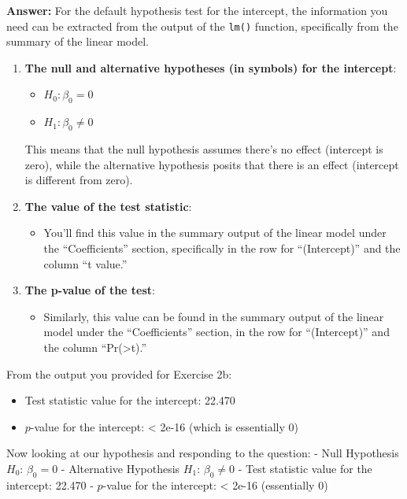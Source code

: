 \documentclass[
]{article}
\providecommand{\tightlist}{%
  \setlength{\itemsep}{0pt}\setlength{\parskip}{0pt}}
\begin{document}
\textbf{Answer:} For the default hypothesis test for the intercept, the
information you need can be extracted from the output of the
\texttt{lm()} function, specifically from the summary of the linear
model.

\begin{enumerate}
\def\labelenumi{\arabic{enumi}.}
\item
  \textbf{The null and alternative hypotheses (in symbols) for the
  intercept}:

  \begin{itemize}
  \tightlist
  \item
    \(H_0: \beta_0 = 0\)
  \item
    \(H_1: \beta_0 \neq 0\)
  \end{itemize}

  This means that the null hypothesis assumes there's no effect
  (intercept is zero), while the alternative hypothesis posits that
  there is an effect (intercept is different from zero).
\item
  \textbf{The value of the test statistic}:

  \begin{itemize}
  \tightlist
  \item
    You'll find this value in the summary output of the linear model
    under the ``Coefficients'' section, specifically in the row for
    ``(Intercept)'' and the column ``t value.''
  \end{itemize}
\item
  \textbf{The p-value of the test}:

  \begin{itemize}
  \tightlist
  \item
    Similarly, this value can be found in the summary output of the
    linear model under the ``Coefficients'' section, in the row for
    ``(Intercept)'' and the column
    ``Pr(\textgreater\textbar t\textbar).''
  \end{itemize}
\end{enumerate}

From the output you provided for Exercise 2b:

\begin{itemize}
\tightlist
\item
  Test statistic value for the intercept: 22.470
\item
  \(p\)-value for the intercept: \textless{} 2e-16 (which is essentially
  0)
\end{itemize}

Now looking at our hypothesis and responding to the question: - Null
Hypothesis \(H_0\): \(\beta_0 = 0\) - Alternative Hypothesis \(H_1\):
\(\beta_0 \neq 0\) - Test statistic value for the intercept: 22.470 -
\(p\)-value for the intercept: \textless{} 2e-16 (essentially 0)
\end{document}
